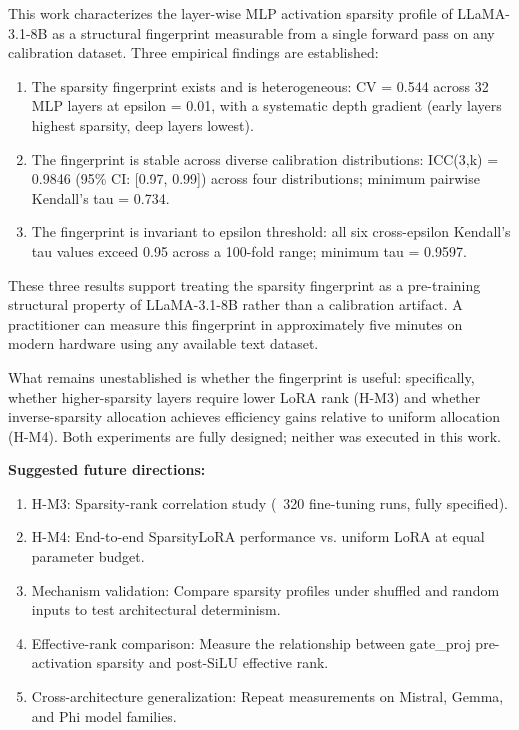
This work characterizes the layer-wise MLP activation sparsity profile of LLaMA-3.1-8B as a structural fingerprint measurable from a single forward pass on any calibration dataset. Three empirical findings are established:

\begin{enumerate}
\item The sparsity fingerprint exists and is heterogeneous: CV = 0.544 across 32 MLP layers at epsilon = 0.01, with a systematic depth gradient (early layers highest sparsity, deep layers lowest).
\item The fingerprint is stable across diverse calibration distributions: ICC(3,k) = 0.9846 (95\% CI: [0.97, 0.99]) across four distributions; minimum pairwise Kendall's tau = 0.734.
\item The fingerprint is invariant to epsilon threshold: all six cross-epsilon Kendall's tau values exceed 0.95 across a 100-fold range; minimum tau = 0.9597.
\end{enumerate}

These three results support treating the sparsity fingerprint as a pre-training structural property of LLaMA-3.1-8B rather than a calibration artifact. A practitioner can measure this fingerprint in approximately five minutes on modern hardware using any available text dataset.

What remains unestablished is whether the fingerprint is useful: specifically, whether higher-sparsity layers require lower LoRA rank (H-M3) and whether inverse-sparsity allocation achieves efficiency gains relative to uniform allocation (H-M4). Both experiments are fully designed; neither was executed in this work.

\textbf{Suggested future directions:}
\begin{enumerate}
\item H-M3: Sparsity-rank correlation study (~320 fine-tuning runs, fully specified).
\item H-M4: End-to-end SparsityLoRA performance vs. uniform LoRA at equal parameter budget.
\item Mechanism validation: Compare sparsity profiles under shuffled and random inputs to test architectural determinism.
\item Effective-rank comparison: Measure the relationship between gate\_proj pre-activation sparsity and post-SiLU effective rank.
\item Cross-architecture generalization: Repeat measurements on Mistral, Gemma, and Phi model families.
\end{enumerate}

